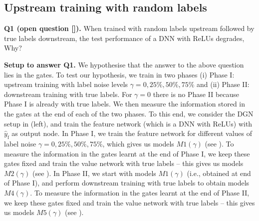 \subsection{Upstream training with random labels}\label{sec:randlabel}
\textbf{Q1 (open question []).} {When trained with random labels upstream followed by true labels downstream, the test performance of a DNN with ReLUs degrades, Why?}

\textbf{Setup to answer Q1.} We hypothesise that the answer to the above question lies in the gates. To test our hypothesis, we train in two phases (i) Phase I: upstream training with label noise levels $\gamma=0, 25\%, 50\%, 75\%$ and (ii) Phase II: downstream training with true labels. For $\gamma=0$ there is no Phase II because Phase I is already with true labels. We then measure the information stored in the gates at the end of each of the two phases. To this end, we consider the DGN setup in  (left), and train the feature network (which is a DNN with ReLUs) with $\hat{y}_{\text{f}}$ as output node. In Phase I, we train the feature network for different values of label noise $\gamma=0, 25\%, 50\%, 75\%$, which gives us models $M1(\gamma)$ (see ). To measure the information in the gates learnt at the end of Phase I, we keep these gates fixed and train the value network with true labels -- this gives us models $M2(\gamma)$ (see ). In Phase II, we start with models $M1(\gamma)$ (i.e., obtained at end of Phase I), and perform downstream training with true labels to obtain models $M4(\gamma)$.  To measure the information in the gates learnt at the end of Phase II, we keep these gates fixed and train the value network with true labels -- this gives us models $M5(\gamma)$ (see ).

